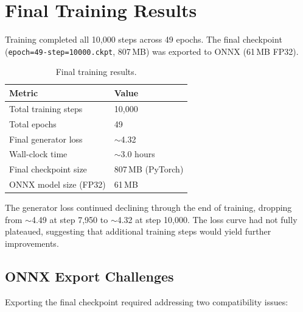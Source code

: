 \documentclass[10pt,a4paper,twocolumn]{article}
\begin{document}
\section{Final Training Results}
\label{sec:final}

Training completed all 10,000 steps across 49 epochs. The final checkpoint (\texttt{epoch=49-step=10000.ckpt}, 807\,MB) was exported to ONNX (61\,MB FP32).

\begin{table}[ht]
\centering
\begin{tabular}{@{}ll@{}}
\toprule
Metric & Value \\
\midrule
Total training steps & 10,000 \\
Total epochs & 49 \\
Final generator loss & $\sim$4.32 \\
Wall-clock time & $\sim$3.0 hours \\
Final checkpoint size & 807\,MB (PyTorch) \\
ONNX model size (FP32) & 61\,MB \\
\bottomrule
\end{tabular}
\caption{Final training results.}
\label{tab:final}
\end{table}

The generator loss continued declining through the end of training, dropping from $\sim$4.49 at step 7,950 to $\sim$4.32 at step 10,000. The loss curve had not fully plateaued, suggesting that additional training steps would yield further improvements.

\subsection{ONNX Export Challenges}

Exporting the final checkpoint required addressing two compatibility issues:
\end{document}
